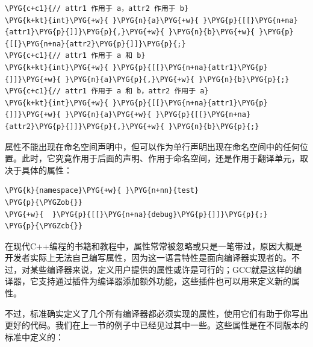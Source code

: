 
\begin{codeblockbg}
\begin{Verbatim}[commandchars=\\\{\},breaklines=true,breakanywhere=true,fontsize=\codefont,xleftmargin=17bp]
\PYG{c+c1}{// attr1 作用于 a，attr2 作用于 b}
\PYG{k+kt}{int}\PYG{+w}{ }\PYG{n}{a}\PYG{+w}{ }\PYG{p}{[[}\PYG{n+na}{attr1}\PYG{p}{]]}\PYG{p}{,}\PYG{+w}{ }\PYG{n}{b}\PYG{+w}{ }\PYG{p}{[[}\PYG{n+na}{attr2}\PYG{p}{]]}\PYG{p}{;}
\PYG{c+c1}{// attr1 作用于 a 和 b}
\PYG{k+kt}{int}\PYG{+w}{ }\PYG{p}{[[}\PYG{n+na}{attr1}\PYG{p}{]]}\PYG{+w}{ }\PYG{n}{a}\PYG{p}{,}\PYG{+w}{ }\PYG{n}{b}\PYG{p}{;}
\PYG{c+c1}{// attr1 作用于 a 和 b，attr2 作用于 a}
\PYG{k+kt}{int}\PYG{+w}{ }\PYG{p}{[[}\PYG{n+na}{attr1}\PYG{p}{]]}\PYG{+w}{ }\PYG{n}{a}\PYG{+w}{ }\PYG{p}{[[}\PYG{n+na}{attr2}\PYG{p}{]]}\PYG{p}{,}\PYG{+w}{ }\PYG{n}{b}\PYG{p}{;}
\end{Verbatim}
\end{codeblockbg}



属性不能出现在命名空间声明中，但可以作为单行声明出现在命名空间中的任何位置。此时，它究竟作用于后面的声明、作用于命名空间，还是作用于翻译单元，取决于具体的属性：



\begin{codeblockbg}
\begin{Verbatim}[commandchars=\\\{\},breaklines=true,breakanywhere=true,fontsize=\codefont,xleftmargin=17bp]
\PYG{k}{namespace}\PYG{+w}{ }\PYG{n+nn}{test}
\PYG{p}{\PYGZob{}}
\PYG{+w}{  }\PYG{p}{[[}\PYG{n+na}{debug}\PYG{p}{]]}\PYG{p}{;}
\PYG{p}{\PYGZcb{}}
\end{Verbatim}
\end{codeblockbg}



在现代C++编程的书籍和教程中，属性常常被忽略或只是一笔带过，原因大概是开发者实际上无法自己编写属性，因为这一语言特性是面向编译器实现者的。不过，对某些编译器来说，定义用户提供的属性或许是可行的；GCC就是这样的编译器，它支持通过插件为编译器添加额外功能，这些插件也可以用来定义新的属性。



不过，标准确实定义了几个所有编译器都必须实现的属性，使用它们有助于你写出更好的代码。我们在上一节的例子中已经见过其中一些。这些属性是在不同版本的标准中定义的：



